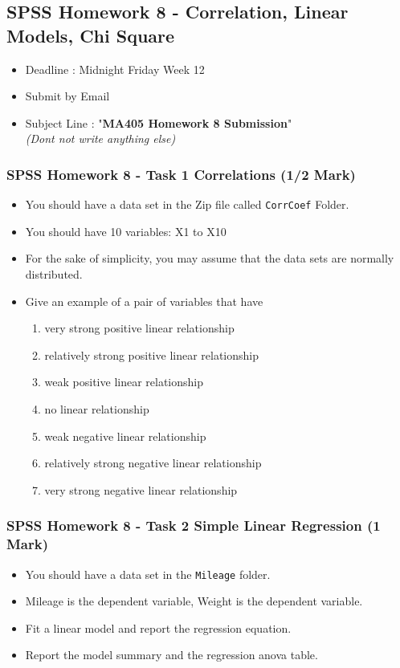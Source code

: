 \documentclass[a4paper,12pt]{article}
\begin{document}
\subsection*{SPSS Homework 8 - Correlation, Linear Models, Chi Square}
	\begin{framed}
		\begin{itemize}
			\item Deadline : Midnight Friday Week 12
			\item Submit by Email
			\item Subject Line : "\textbf{MA405 Homework 8 Submission}" \\ \textit{(Dont not write anything else)}
		\end{itemize}
	\end{framed}

\subsubsection*{SPSS Homework 8 - Task 1 Correlations (1/2 Mark) }
\begin{itemize}
	\item You should have a data set in the Zip file called \texttt{CorrCoef} Folder.
	
\item You should have 10 variables: X1 to X10
\item For the sake of simplicity, you may assume that the data sets are normally distributed.
\item Give an example of a pair of variables that have
	
	\begin{enumerate}
	\item very strong positive linear relationship 
	\item relatively strong positive linear relationship
	\item weak positive linear relationship
	\item no linear relationship
	\item weak negative linear relationship
	\item relatively strong negative linear relationship
	\item very strong negative linear relationship 
\end{enumerate}
\end{itemize}
\subsubsection*{SPSS Homework 8 - Task 2 Simple Linear Regression (1 Mark)}
\begin{itemize}
	\item You should have a data set in the  \texttt{Mileage} folder.
	\item Mileage is the dependent variable, Weight is the dependent variable.
	\item Fit a linear model and report the regression equation.
	\item Report the model summary and the regression anova table.
\end{itemize}
\end{document}

